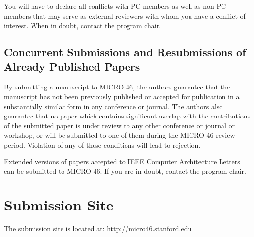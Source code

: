 \documentclass[pageno]{jpaper}
\begin{document}
You will have to declare all conflicts with PC members as well as
non-PC members that may serve as external reviewers with whom you
have a conflict of interest. When in doubt, contact the program chair.


\subsection{Concurrent Submissions and Resubmissions of Already Published Papers}

By submitting a manuscript to MICRO-46, the authors guarantee that the
manuscript has not been previously published or accepted for
publication in a substantially similar form in any conference or
journal. The authors also guarantee that no paper which contains
significant overlap with the contributions of the submitted paper is
under review to any other conference or journal or workshop, or will
be submitted to one of them during the MICRO-46 review
period. Violation of any of these conditions will lead to rejection.

Extended versions of papers accepted to IEEE Computer Architecture
Letters can be submitted to MICRO-46.  If you are in doubt, contact
the program chair.

\section{Submission Site}

The submission site is located at:
\href{http://micro46.stanford.edu}{http://micro46.stanford.edu}



\end{document}

